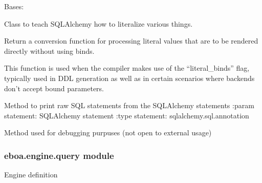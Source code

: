 
\begin{fulllineitems}
\label{\detokenize{eboa.engine:eboa.engine.printing.StringLiteral}}
Bases: 

Class to teach SQLAlchemy how to literalize various things.

\begin{fulllineitems}
\label{\detokenize{eboa.engine:eboa.engine.printing.StringLiteral.literal_processor}}
Return a conversion function for processing literal values that are
to be rendered directly without using binds.

This function is used when the compiler makes use of the
“literal\_binds” flag, typically used in DDL generation as well
as in certain scenarios where backends don’t accept bound parameters.


\end{fulllineitems}


\end{fulllineitems}


\begin{fulllineitems}
\label{\detokenize{eboa.engine:eboa.engine.printing.literal_query}}
Method to print raw SQL statements from the SQLAlchemy statements
:param statement: SQLAlchemy statement
:type statement: sqlalchemy.sql.annotation

Method used for debugging purpuses (not open to external usage)

\end{fulllineitems}



\subsubsection{eboa.engine.query module}
\label{\detokenize{eboa.engine:module-eboa.engine.query}}\label{\detokenize{eboa.engine:eboa-engine-query-module}}
Engine definition

